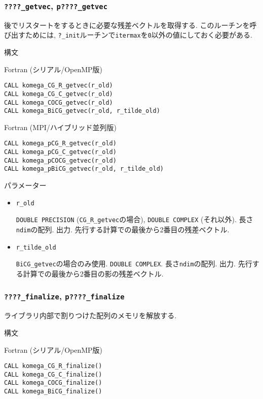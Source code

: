\documentclass[12pt,titlepage]{jarticle}
\begin{document}
\subsubsection{\texttt{????\_getvec}, \texttt{p????\_getvec}}

後でリスタートをするときに必要な残差ベクトルを取得する.
このルーチンを呼び出すためには,
\verb|?_init|ルーチンで\verb|itermax|を\verb|0|以外の値にしておく必要がある.

\noindent 構文

\noindent Fortran (シリアル/OpenMP版)
\begin{verbatim}
CALL komega_CG_R_getvec(r_old)
CALL komega_CG_C_getvec(r_old)
CALL komega_COCG_getvec(r_old)
CALL komega_BiCG_getvec(r_old, r_tilde_old)
\end{verbatim}

\noindent Fortran (MPI/ハイブリッド並列版)
\begin{verbatim}
CALL komega_pCG_R_getvec(r_old)
CALL komega_pCG_C_getvec(r_old)
CALL komega_pCOCG_getvec(r_old)
CALL komega_pBiCG_getvec(r_old, r_tilde_old)
\end{verbatim}

\noindent パラメーター

\begin{itemize}
  
\item \verb|r_old|

  \verb|DOUBLE PRECISION| (\verb|CG_R_getvec|の場合),
  \verb|DOUBLE COMPLEX| (それ以外).
  長さ\verb|ndim|の配列. 出力.
  先行する計算での最後から2番目の残差ベクトル.

\item \verb|r_tilde_old|

  \verb|BiCG_getvec|の場合のみ使用.
  \verb|DOUBLE COMPLEX|.
  長さ\verb|ndim|の配列. 出力.
  先行する計算での最後から2番目の影の残差ベクトル.

\end{itemize}

\subsubsection{\texttt{????\_finalize}, \texttt{p????\_finalize}}

ライブラリ内部で割りつけた配列のメモリを解放する.

\noindent 構文

\noindent Fortran (シリアル/OpenMP版)
\begin{verbatim}
CALL komega_CG_R_finalize()
CALL komega_CG_C_finalize()
CALL komega_COCG_finalize()
CALL komega_BiCG_finalize()
\end{verbatim}
\end{document}
